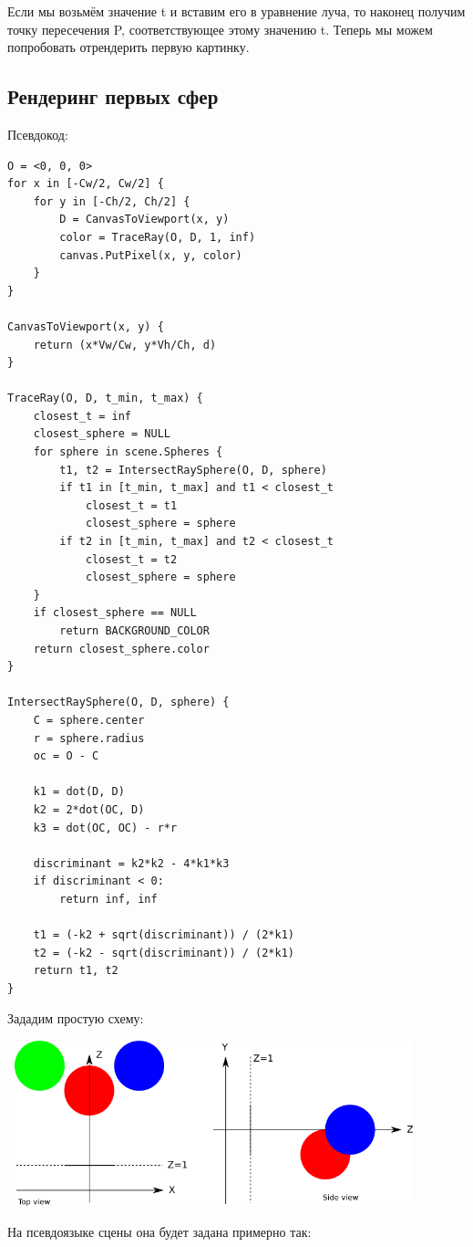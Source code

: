 Если мы возьмём значение t и вставим его в уравнение луча, то наконец получим точку пересечения P, соответствующее этому значению t.
Теперь мы можем попробовать отрендерить первую картинку.
\newpage
\subsection{Рендеринг первых сфер}
Псевдокод:
\begin{lstlisting}
O = <0, 0, 0>
for x in [-Cw/2, Cw/2] {
    for y in [-Ch/2, Ch/2] {
        D = CanvasToViewport(x, y)
        color = TraceRay(O, D, 1, inf)
        canvas.PutPixel(x, y, color)
    }
}

CanvasToViewport(x, y) {
    return (x*Vw/Cw, y*Vh/Ch, d)
}

TraceRay(O, D, t_min, t_max) {
    closest_t = inf
    closest_sphere = NULL
    for sphere in scene.Spheres {
        t1, t2 = IntersectRaySphere(O, D, sphere)
        if t1 in [t_min, t_max] and t1 < closest_t
            closest_t = t1
            closest_sphere = sphere
        if t2 in [t_min, t_max] and t2 < closest_t
            closest_t = t2
            closest_sphere = sphere
    }
    if closest_sphere == NULL
        return BACKGROUND_COLOR
    return closest_sphere.color
}

IntersectRaySphere(O, D, sphere) {
    C = sphere.center
    r = sphere.radius
    oc = O - C

    k1 = dot(D, D)
    k2 = 2*dot(OC, D)
    k3 = dot(OC, OC) - r*r

    discriminant = k2*k2 - 4*k1*k3
    if discriminant < 0:
        return inf, inf

    t1 = (-k2 + sqrt(discriminant)) / (2*k1)
    t2 = (-k2 - sqrt(discriminant)) / (2*k1)
    return t1, t2
}
\end{lstlisting}

\newpage
Зададим простую схему:

\includegraphics[width=12cm, height=4.8cm]{scene.png}

На псевдоязыке сцены она будет задана примерно так:

